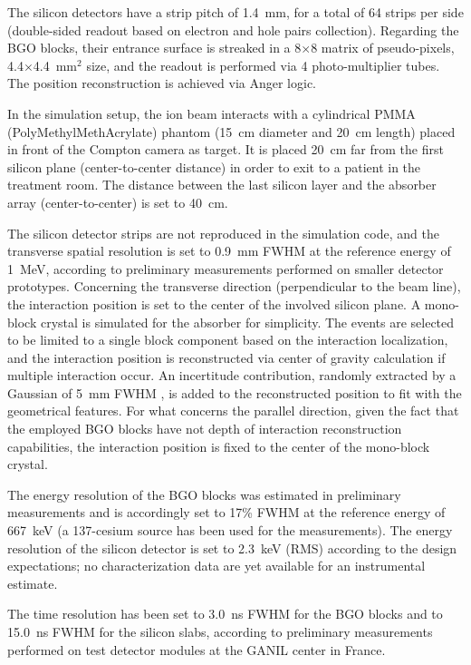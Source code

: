 The silicon detectors have a strip pitch of 1.4~mm, for a total of 64 strips per side (double-sided readout based on electron and hole pairs collection). 
Regarding the BGO blocks, their entrance surface is streaked in a 8$\times$8 matrix of pseudo-pixels, 4.4$\times$4.4~mm$^{2}$ size, and the readout is performed via 4 photo-multiplier tubes. The position reconstruction is achieved via Anger logic.

In the simulation setup, the ion beam interacts with a cylindrical PMMA (PolyMethylMethAcrylate) phantom (15~cm diameter and 20~cm length) placed in front of the Compton camera as target. It is placed 20~cm far from the first silicon plane (center-to-center distance) in order to exit to a patient in the treatment room. The distance between the last silicon layer and the absorber array (center-to-center) is set to 40~cm.

The silicon detector strips are not reproduced in the simulation code, and the transverse spatial resolution is set to 0.9~mm FWHM at the reference energy of 1~MeV, according to preliminary measurements performed on smaller detector prototypes. Concerning the transverse direction (perpendicular to the beam line), the interaction position is set to the center of the involved silicon plane. A mono-block crystal is simulated for the absorber for simplicity. The events are selected to be limited to a single block component based on the interaction localization, and the interaction position is reconstructed via center of gravity calculation if multiple interaction occur. An incertitude contribution, randomly extracted by a Gaussian of 5~mm FWHM , is added to the reconstructed position to fit with the geometrical features. For what concerns the parallel direction, given the fact that the employed BGO blocks have not depth of interaction reconstruction capabilities, the interaction position is fixed to the center of the mono-block crystal.

The energy resolution of the BGO blocks was estimated in preliminary measurements and is accordingly set to 17\% FWHM at the reference energy of 667~keV (a 137-cesium source has been used for the measurements). The energy resolution of the silicon detector is set to 2.3~keV (RMS) according to the design expectations; no characterization data are yet available for an instrumental estimate.

The time resolution has been set to 3.0~ns FWHM for the BGO blocks and to 15.0~ns FWHM for the silicon slabs, according to preliminary measurements performed on test detector modules at the GANIL %
center in France.

